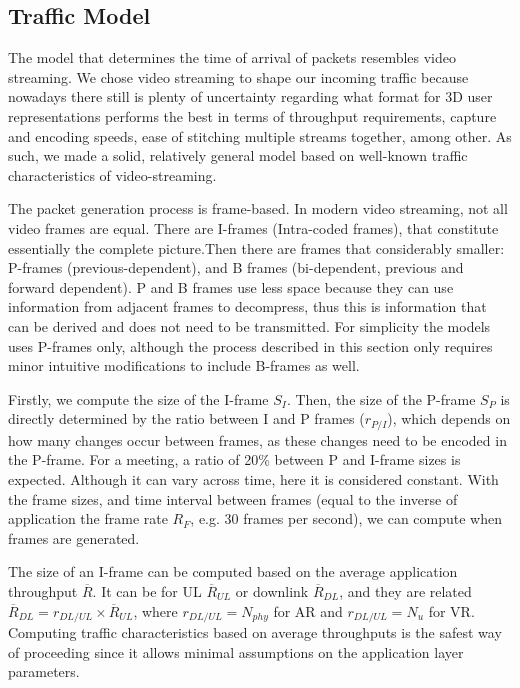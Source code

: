 \subsection{Traffic Model}
\label{sec:at}


The model that determines the time of arrival of packets resembles video streaming. We chose video streaming to shape our incoming traffic because nowadays there still is plenty of uncertainty regarding what format for 3D user representations performs the best in terms of throughput requirements, capture and encoding speeds, ease of stitching multiple streams together, among other. As such, we made a solid, relatively general model based on well-known traffic characteristics of video-streaming. 

The packet generation process is frame-based. In modern video streaming, not all video frames are equal. There are I-frames (Intra-coded frames), that constitute essentially the complete picture.Then there are frames that considerably smaller: P-frames (previous-dependent), and B frames (bi-dependent, previous and forward dependent). P and B frames use less space because they can use information from adjacent frames to decompress, thus this is information that can be derived and does not need to be transmitted. For simplicity the models uses P-frames only, although the process described in this section only requires minor intuitive modifications to include B-frames as well.


Firstly, we compute the size of the I-frame $S_I$. Then, the size of the P-frame $S_P$ is directly determined by the ratio between I and P frames ($r_{P/I}$), which depends on how many changes occur between frames, as these changes need to be encoded in the P-frame. For a meeting, a ratio of 20\% between P and I-frame sizes is expected. Although it can vary across time, here it is considered constant. With the frame sizes, and time interval between frames (equal to the inverse of application the frame rate $R_F$, e.g. 30 frames per second), we can compute when frames are generated. 

The size of an I-frame can be computed based on the average application throughput $\overline{R}$. It can be for UL $\overline{R}_{UL}$ or downlink $\overline{R}_{DL}$, and they are related $\overline{R}_{DL} = r_{DL/UL} \times \overline{R}_{UL}$, where $r_{DL/UL} = N_{phy}$ for AR and $r_{DL/UL} = N_{u}$ for VR. Computing traffic characteristics based on average throughputs is the safest way of proceeding since it allows minimal assumptions on the application layer parameters. 

